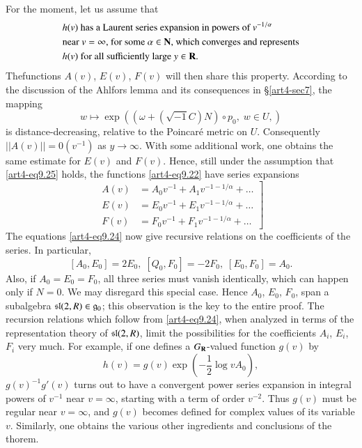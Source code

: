 For the moment, let us assume that 
\begin{align}
&\text{$h(v)$ has a Laurent series expansion in powers of $v^{-1/\alpha}$}\notag\\
&\text{near $v = \infty$, for some $\alpha \in \mathbf{N}$, which converges and represents}\notag\\
& \text{$h(v)$ for all sufficiently large $ y \in \mathbf{R}$}. \label{art4-eq9.25}
\end{align}
The\pageoriginale functions $A(v)$, $E(v)$, $F(v)$ will then share this property. According to the discussion of the Ahlfors lemma and its consequences in \S \ref{art4-sec7}, the mapping
$$
w \longmapsto \exp ((\omega + (\sqrt{-1} C) N) \circ p_0, \; w \in U,)
$$
is distance-decreasing, relative to the Poincar\'e metric on $U$. Consequently $||A(v)||= 0 (v^{-1})$ as $y \to \infty$. With some additional work, one obtains the same estimate for $E(v)$ and $F(v)$. Hence, still under the assumption that \eqref{art4-eq9.25} holds, the functions \eqref{art4-eq9.22} have series expansions
\begin{equation}
\left. 
\begin{aligned}
A (v) & = A_0 v^{-1} + A_1 v^{-1-1/\alpha} + \ldots \\
E(v) & = E_0 v^{-1} + E_1 v^{-1-1/\alpha} + \ldots \\
F(v) & = F_0 v^{-1} + F_1 v^{-1-1/\alpha} + \ldots
\end{aligned}
\right]\label{art4-eq9.26}
\end{equation}
The equations \eqref{art4-eq9.24} now give recursive relations on the coefficients of the series. In particular,
$$
[A_0, E_0] = 2 E_0, \; [Q_0, F_0] = - 2 F_0, \; [E_0 , F_0] = A_0.
$$  
Also, if $A_0 = E_0 = F_0$, all three series must vanish identically, which can happen only if $N =0$. We may disregard this special case. Hence $A_0$, $E_0$, $F_0$, span a subalgebra $\mathfrak{s} \mathfrak{l} (2,R) \in \mathfrak{g}_0$; this observation is the key to the entire proof. The recursion relations which follow from \eqref{art4-eq9.24}, when analyzed in terms of the representation theory of $\mathfrak{s} \mathfrak{l} (2, R)$, limit the possibilities for the coefficients $A_i$, $E_i$, $F_i$ very much. For example, if one defines a $G_{\mathbf{R}}$-valued function $g (v)$ by
$$
h(v) = g(v) \exp (- \frac{1}{2} \log v A_0),
$$
$g(v)^{-1} g'(v)$ turns out to have a convergent power series expansion in integral powers of $v^{-1}$ near $v = \infty$, starting with a term of order $v^{-2}$. Thus $g (v)$ must be regular near $v = \infty$, and $g(v)$ becomes defined for complex values of its variable $v$. Similarly, one obtains the various other ingredients and conclusions of the thorem.

